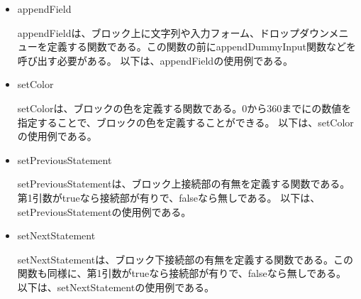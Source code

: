 \documentclass{risepaper}
\begin{document}
\begin{itemize}

\item appendField

appendFieldは、ブロック上に文字列や入力フォーム、ドロップダウンメニューを定義する関数である。この関数の前にappendDummyInput関数などを呼び出す必要がある。
以下は、appendFieldの使用例である。


\item setColor

setColorは、ブロックの色を定義する関数である。0から360までにの数値を指定することで、ブロックの色を定義することができる。
以下は、setColorの使用例である。


\item setPreviousStatement

setPreviousStatementは、ブロック上接続部の有無を定義する関数である。第1引数がtrueなら接続部が有りで、falseなら無しである。
以下は、setPreviousStatementの使用例である。


\item setNextStatement

setNextStatementは、ブロック下接続部の有無を定義する関数である。この関数も同様に、第1引数がtrueなら接続部が有りで、falseなら無しである。
以下は、setNextStatementの使用例である。



\end{itemize}
\end{document}
